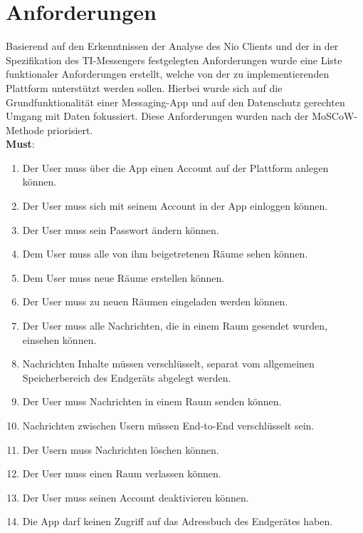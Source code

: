     \section{Anforderungen}\label{sec:anforderungen}
    Basierend auf den Erkenntnissen der Analyse des Nio Clients und der in der Spezifikation des TI-Messengers festgelegten Anforderungen wurde eine Liste funktionaler Anforderungen erstellt, welche von der zu implementierenden Plattform unterstützt werden sollen.
    Hierbei wurde sich auf die Grundfunktionalität einer Messaging-App und auf den Datenschutz gerechten Umgang mit Daten fokussiert.
    Diese Anforderungen wurden nach der MoSCoW-Methode priorisiert.\\
    \textbf{Must}:
    \begin{enumerate}[label={\roman*.}, leftmargin=2.5cm]
        \item Der User muss über die App einen Account auf der Plattform anlegen können.
        \item Der User muss sich mit seinem Account in der App einloggen können.
        \item Der User muss sein Passwort ändern können.
        \item Dem User muss alle von ihm beigetretenen Räume sehen können.
        \item Dem User muss neue Räume erstellen können.
        \item Der User muss zu neuen Räumen eingeladen werden können.
        \item Der User muss alle Nachrichten, die in einem Raum gesendet wurden, einsehen können.
        \item Nachrichten Inhalte müssen verschlüsselt, separat vom allgemeinen Speicherbereich des Endgeräts abgelegt werden.
        \item Der User muss Nachrichten in einem Raum senden können.
        \item Nachrichten zwischen Usern müssen End-to-End verschlüsselt sein.
        \item Der Usern muss Nachrichten löschen können.
        \item Der User muss einen Raum verlassen können.
        \item Der User muss seinen Account deaktivieren können.
        \item Die App darf keinen Zugriff auf das Adressbuch des Endgerätes haben.
    \end{enumerate}


